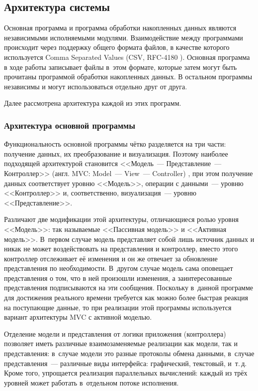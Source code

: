 \documentclass[a4paper, 14pt, titlepage]{extarticle}
\newcommand{\eng}[1]{\foreignlanguage{english}{#1}}
\begin{document}
  \subsection{Архитектура системы}

  Основная программа и программа обработки накопленных данных являются независимыми исполняемыми
  модулями. Взаимодействие между программами происходит через поддержку общего формата файлов, в
  качестве которого используется \eng{Comma Separated Values} (CSV, RFC-4180 \cite{rfc4180}).
  Основная программа в ходе работы записывает файлы в~этом формате, которые затем могут быть прочитаны
  программой обработки накопленных данных. В остальном программы независимы и могут использоваться
  отдельно друг от друга.

  Далее рассмотрена архитектура каждой из этих программ.

  \subsubsection{Архитектура основной программы}\label{sssec:main-arch}

  Функциональность основной программы чётко разделяется на три части: получение данных, их
  преобразование и визуализация. Поэтому наиболее подходящей архитектурой становится
  <<Модель~--- Представление~--- Контроллер>> (англ. \eng{MVC: Model~--- View~--- Controller})
  \cite{gamma-patterns}, при этом получение данных соответствует уровню <<Модель>>, операции с
  данными~--- уровню <<Контроллер>> и, соответственно, визуализация~--- уровню <<Представление>>.

  Различают две модификации этой архитектуры, отличающиеся ролью уровня <<Модель>>: так называемые
  <<Пассивная модель>> и <<Активная модель>>. В~первом случае модель представляет собой лишь
  источник данных и никак не может воздействовать на представления и контроллер, вместо этого
  контроллер отслеживает её изменения и он же отвечает за обновление представления по необходимости.
  В~другом случае модель сама оповещает представления о том, что в ней произошли изменения, а
  заинтересованные представления подписываются на эти сообщения. Поскольку в~данной программе для
  достижения реального времени требуется как можно более быстрая реакция на поступающие данные, то
  при реализации этой программы используется вариант архитектуры MVC с активной моделью.

  Отделение модели и представления от логики приложения (контроллера) позволяет иметь различные
  взаимозаменяемые реализации как модели, так и представления: в~случае модели это разные протоколы
  обмена данными, в~случае представления~--- различные виды интерфейса: графический, текстовый, и~т.\,д.
  Кроме того, упрощается реализация параллельных вычислений: каждый из трёх уровней может работать
  в~отдельном потоке исполнения.
\end{document}
